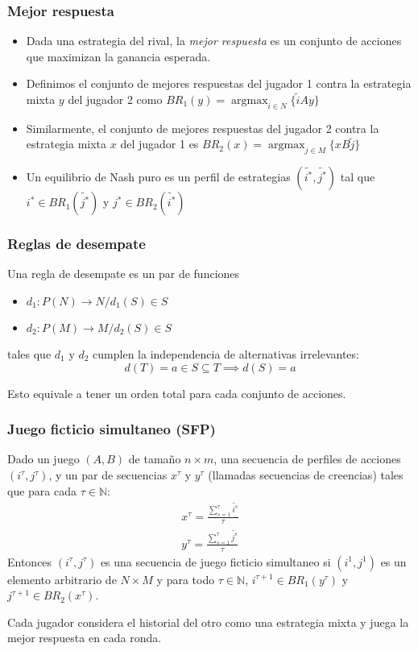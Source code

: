 \documentclass[handout, pdf]{beamer}
\newcommand{\pstrat}{\widetilde}
\DeclareMathOperator*{\argmax}{argmax}
\begin{document}
\begin{frame}
    \frametitle{Mejor respuesta}

    \begin{itemize}
        \item Dada una estrategia del rival, la \emph{mejor respuesta} es un conjunto de acciones que maximizan la ganancia esperada.
        \item Definimos el conjunto de mejores respuestas del jugador 1 contra la estrategia mixta $y$ del jugador 2 como $BR_1(y) = \argmax_{i \in N}\{ \pstrat{i}Ay\}$
        \pause
        \item Similarmente, el conjunto de mejores respuestas del jugador 2 contra la estrategia mixta $x$ del jugador 1 es $BR_2(x) = \argmax_{j \in M}\{ xB\pstrat{j}\}$
        \pause
        \item Un equilibrio de Nash puro es un perfil de estrategias $(\pstrat{i^*}, \pstrat{j^*})$ tal que $i^* \in BR_1(\pstrat{j^*})$ y $j^* \in BR_2(\pstrat{i^*})$
    \end{itemize}
\end{frame}

\begin{frame}
    \frametitle{Reglas de desempate}
    Una regla de desempate es un par de funciones
        \begin{itemize}
        \item $d_1: P(N) \rightarrow N / d_1(S) \in S$
        \item $d_2: P(M) \rightarrow M / d_2(S) \in S$
        \end{itemize}
    tales que $d_1$ y $d_2$ cumplen la independencia de alternativas irrelevantes:
    \[
        d(T) = a \in S \subseteq T \implies d(S) = a
    \]

    \pause
    Esto equivale a tener un orden total para cada conjunto de acciones.
\end{frame}

\begin{frame}
    \frametitle{Juego ficticio simultaneo (SFP)}
    \begin{definition} 
        Dado un juego $(A, B)$  de tamaño $n \times m$, una secuencia de perfiles de acciones $(i^\tau, j^\tau)$, y un par de secuencias $x^\tau$ y $y^\tau$ (llamadas secuencias de creencias) tales que para cada $\tau \in \mathbb{N}$:
        \begin{gather*}
            x^\tau= \frac{\sum^\tau_{s=1} \pstrat{i^s}}{\tau}  \\
            y^\tau= \frac{\sum^\tau_{s=1} \pstrat{j^s}}{\tau}
        \end{gather*}
        Entonces $(i^\tau, j^\tau)$ es una secuencia de juego ficticio simultaneo si $(i^1, j^1)$ es un elemento arbitrario de $N \times M$ y para todo $\tau \in \mathbb{N}$, $i^{\tau+1} \in BR_1(y^\tau)$ y $j^{\tau+1} \in BR_2(x^\tau)$.
    \end{definition}
    Cada jugador considera el historial del otro como una estrategia mixta y juega la mejor respuesta en cada ronda.
\end{frame}
\end{document}
